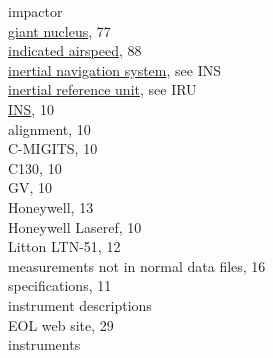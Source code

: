 \documentclass[
]{book}
\begin{document}
impactor\\
\hspace*{0.333em}\hspace*{0.333em}\href{./7-aerosol-particle-measurements.html\#special-aerosol}{giant nucleus}, 77\\
\href{./10-obsolete-variables\#ias}{indicated airspeed}, 88\\
\href{./3-the-state-of-the-aircraft.html\#inertial-reference-systems}{inertial navigation system}, see INS\\
\href{./10-obsolete-variables.html\#mdy}{inertial reference unit}, see IRU\\
\href{./3-the-state-of-the-aircraft.html\#inertial-reference-systems}{INS}, 10\\
\hspace*{0.333em}\hspace*{0.333em}alignment, 10\\
\hspace*{0.333em}\hspace*{0.333em}C-MIGITS, 10\\
\hspace*{0.333em}\hspace*{0.333em}C130, 10\\
\hspace*{0.333em}\hspace*{0.333em}GV, 10\\
\hspace*{0.333em}\hspace*{0.333em}Honeywell, 13\\
\hspace*{0.333em}\hspace*{0.333em}Honeywell Laseref, 10\\
\hspace*{0.333em}\hspace*{0.333em}Litton LTN-51, 12\\
\hspace*{0.333em}\hspace*{0.333em}measurements not in normal data files, 16\\
\hspace*{0.333em}\hspace*{0.333em}specifications, 11\\
instrument descriptions\\
\hspace*{0.333em}\hspace*{0.333em}EOL web site, 29\\
instruments\\
\end{document}
